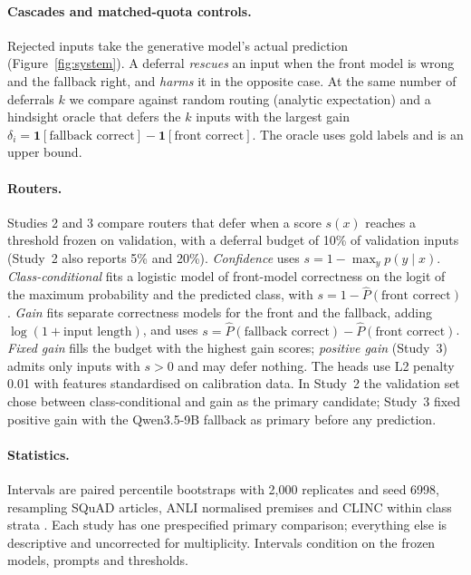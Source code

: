 \documentclass[11pt]{article}
\begin{document}
\paragraph{Cascades and matched-quota controls.}
Rejected inputs take the generative model's actual prediction (Figure~\ref{fig:system}). A deferral \emph{rescues} an input when the front model is wrong and the fallback right, and \emph{harms} it in the opposite case. At the same number of deferrals $k$ we compare against random routing (analytic expectation) and a hindsight oracle that defers the $k$ inputs with the largest gain $\delta_i = \mathbf{1}[\text{fallback correct}]-\mathbf{1}[\text{front correct}]$. The oracle uses gold labels and is an upper bound.

\paragraph{Routers.}
\label{sec:routers}
Studies 2 and 3 compare routers that defer when a score $s(x)$ reaches a threshold frozen on validation, with a deferral budget of 10\% of validation inputs (Study~2 also reports 5\% and 20\%). \emph{Confidence} uses $s=1-\max_y p(y\mid x)$. \emph{Class-conditional} fits a logistic model of front-model correctness on the logit of the maximum probability and the predicted class, with $s=1-\hat P(\text{front correct})$. \emph{Gain} fits separate correctness models for the front and the fallback, adding $\log(1+\text{input length})$, and uses $s=\hat P(\text{fallback correct})-\hat P(\text{front correct})$. \emph{Fixed gain} fills the budget with the highest gain scores; \emph{positive gain} (Study~3) admits only inputs with $s>0$ and may defer nothing. The heads use L2 penalty 0.01 with features standardised on calibration data. In Study~2 the validation set chose between class-conditional and gain as the primary candidate; Study~3 fixed positive gain with the Qwen3.5-9B fallback as primary before any prediction.

\paragraph{Statistics.}
Intervals are paired percentile bootstraps with 2,000 replicates and seed 6998, resampling SQuAD articles, ANLI normalised premises and CLINC within class strata \citep{field2007bootstrapping}. Each study has one prespecified primary comparison; everything else is descriptive and uncorrected for multiplicity. Intervals condition on the frozen models, prompts and thresholds.
\end{document}
